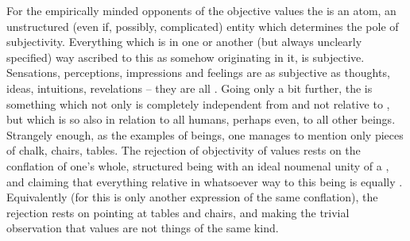 For the empirically minded opponents of the {objective values} the
 is an atom, an unstructured (even if, possibly, complicated)
entity which determines the pole of subjectivity.  Everything which is in one or
another (but always unclearly specified) way ascribed to this  as
somehow originating in it, is subjective.  Sensations, perceptions, impressions
and feelings are as subjective as thoughts, ideas, intuitions, revelations --
they are all .  Going only a bit further, the  is
something which not only is completely independent from and not relative to
, but which is so also in relation to all humans, perhaps even, to all
other beings.  Strangely enough, as the examples of  beings, one
manages to mention only pieces of chalk, chairs, tables.  The rejection of
{objectivity} of values rests on the conflation of one's whole, structured being
with an ideal noumenal unity of a , and claiming that everything
relative in whatsoever way to this being is equally .
Equivalently (for this is only another expression of the same conflation), the
rejection rests on pointing at tables and chairs, and making the trivial
observation that values are not things of the same kind.


